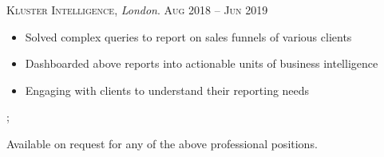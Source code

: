 \documentclass[a4paper]{limecv}
\begin{document}
\begin{cvMainContent}
\begin{cvExperience}
{        \textsc{\selectfont Kluster Intelligence}, \textit{London}. \hfill \textsc{Aug} 2018 -- \textsc{Jun} 2019\\
        \begin{itemize}
        \item Solved complex queries to report on sales funnels of various clients
        \item Dashboarded above reports into actionable units of business intelligence 
        \item Engaging with clients to understand their reporting needs
        \end{itemize}};
    \end{cvExperience}

    \begin{cvEducation}
    \end{cvEducation}
    
    \begin{cvSkills}
    \end{cvSkills}
  
    \begin{cvReferences}
      Available on request for any of the above professional positions.
    \end{cvReferences}
  
  \end{cvMainContent}
  
  
\end{document}
